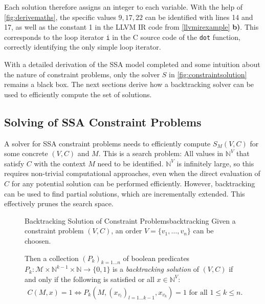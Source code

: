     Each solution therefore assigns an integer to each variable.
    With the help of \autoref{fig:derivemaths}, the specific values $9,17,22$
    can be identified with lines 14 and 17, as well as the constant 1 in the
    LLVM IR code from \autoref{llvmirexample} {\bf b)}.
    This corresponds to the loop iterator \texttt{i} in the C source code of the
    \texttt{dot} function, correctly identifying the only simple loop iterator.

    With a detailed derivation of the SSA model completed and some intuition
    about the nature of constraint problems, only the solver $S$ in
    \autoref{fig:constraintsolution} remains a black box.
    The next sections derive how a backtracking solver can
    be used to efficiently compute the set of solutions.

\subsection{Solving of SSA Constraint Problems}

    A solver for SSA constraint problems needs to efficiently compute $S_M(V,C)$
    for some concrete $(V,C)$ and $M$.
    This is a search problem:
    All values in $\mathbb N^V$ that satisfy $C$ with the context $M$ need to
    be identified.
    $\mathbb N^V$ is infinitely large, so this requires non-trivial
    computational approaches, even when the direct evaluation of $C$ for any
    potential solution can be performed efficiently.
    However, backtracking can be used to find partial solutions, which are
    incrementally extended.
    This effectively prunes the search space.

\begin{figure}[h]
    \begin{definition}{Backtracking Solution of Constraint Problems}{backtracking}
        Given a constraint problem $(V,C)$, an order $V=\{v_1,\dots,v_n\}$ can
        be choosen.

        Then a collection $(P_k)_{k=1\dots n}$ of boolean predicates
        $P_k:\mathcal M\times \mathbb N^{k-1}\times\mathbb N\rightarrow\{0,1\}$
        is a {\em backtracking solution} of $(V,C)$ if and only if the
        following is satisfied or all $x\in\mathbb N^V$:
        \begin{align}
            C(M,x)=1\iff P_k(M,(x_{v_l})_{l=1\dots k-1},x_{v_k})=1\text{ for all }1\leq k\leq n.
        \end{align}
    \end{definition}
\end{figure}

